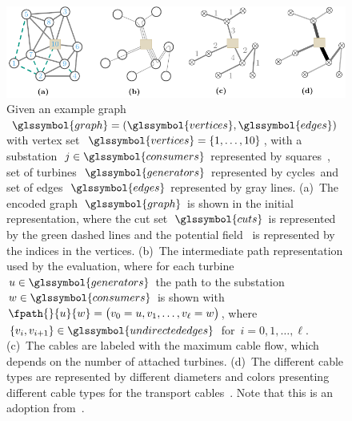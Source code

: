 \begin{figure}[t!]
    \centering
    \includegraphics[page=1]{windfarmplacement/figures/representation-acm}
    \caption[The~\acrlong{sa} representation used within this work.]{Given an
    example graph~$\glssymbol{graph} = (\glssymbol{vertices},
    \glssymbol{edges})$ with vertex set~\mbox{$\glssymbol{vertices}=
    \{1,\dots,10\}$}, with a substation~$\substation\in\glssymbol{consumers}$
    represented by squares~\tikzSubstation, set of
    turbines~$\glssymbol{generators}$ represented by cycles~\tikzTurbine and set
    of edges~$\glssymbol{edges}$ represented by gray lines. (a)~The encoded
    graph~$\glssymbol{graph}$ is shown in the initial representation, where the
    cut set~$\glssymbol{cuts}$ is represented by the green dashed lines and the
    potential field~\textcolor{THETA}{} is represented by
    the indices in the vertices. (b)~The intermediate path representation used
    by the evaluation, where for each
    turbine~$\vertexa\in\glssymbol{generators}$ the path to the
    substation~$\vertexc\in\glssymbol{consumers}$ is shown
    with~$\fpath{}{\vertexa}{\vertexc} = \big(\vertex_0=\vertexa,
    \vertex_1, \dots,\vertex_\ell=\vertexc\big)$, where~$\{\vertex_{i},
    \vertex_{i+1}\}\in\glssymbol{undirectededges}$ for~$i=0,1,\dots,\ell$.
    (c)~The cables are labeled with the maximum cable flow, which depends on the
    number of attached turbines. (d)~The different cable types are represented
    by different diameters and colors presenting different cable types for the
    transport cables~\tikzTransportCable. Note that this is an adoption
    from~\textcite{LehMT16}.}
    \label{ch:wfcp:fig:sa-representation}
\end{figure}
% 


